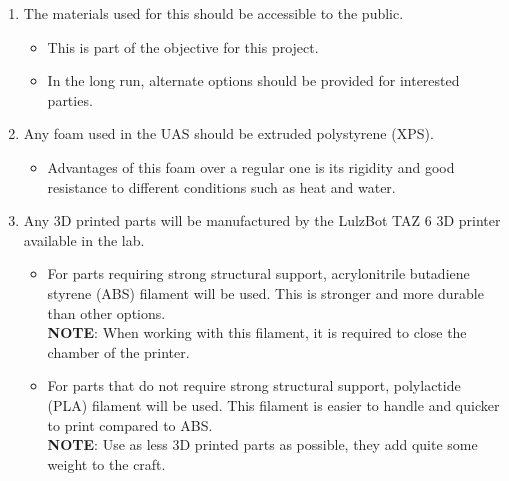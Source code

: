 \documentclass{article}
\begin{document}
\begin{enumerate}
  \item{The materials used for this should be accessible to the public.}
  \begin{itemize}
    \item{This is part of the objective for this project.}
    \item{In the long run, alternate options should be provided for interested parties.}
  \end{itemize}
  
  \item{Any foam used in the UAS should be extruded polystyrene (XPS).}
  \begin{itemize}
    \item{Advantages of this foam over a regular one is its rigidity and good resistance to different conditions such as heat and water.}
  \end{itemize}
  
  \item{Any 3D printed parts will be manufactured by the LulzBot TAZ 6 3D printer available in the lab.}
  \begin{itemize}
    \item{For parts requiring strong structural support, acrylonitrile butadiene styrene (ABS) filament will be used. This is stronger and more durable than other options.}\\
    \textbf{NOTE}: When working with this filament, it is required to close the chamber of the printer.
    \item{For parts that do not require strong structural support, polylactide (PLA) filament will be used. This filament is easier to handle and quicker to print compared to ABS.}\\
    \textbf{NOTE}:  Use as less 3D printed parts as possible, they add quite some weight to the craft.
  \end{itemize}
  
\end{enumerate}
\end{document}
